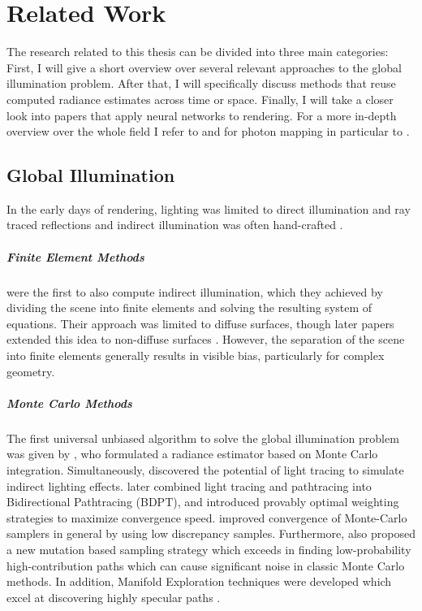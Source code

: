
\chapter{Related Work}
\label{chap:related}
The research related to this thesis can be divided into three main categories:
First, I will give a short overview over several relevant approaches to the global illumination problem.
After that, I will specifically discuss methods that reuse computed radiance estimates across time or space.
Finally, I will take a closer look into papers that apply neural networks to rendering.
For a more in-depth overview over the whole field I refer to \textcite{ritschel2012} and for photon mapping in particular to \textcite{kang2016}.

\section{Global Illumination}
In the early days of rendering, lighting was limited to direct illumination and ray traced reflections  and indirect illumination was often hand-crafted .

\paragraph{Finite Element Methods}
\textcite{goral1984} were the first to also compute indirect illumination, which they achieved by dividing the scene into finite elements and solving the resulting system of equations.
Their approach was limited to diffuse surfaces, though later papers extended this idea to non-diffuse surfaces .
However, the separation of the scene into finite elements generally results in visible bias, particularly for complex geometry.

\paragraph{Monte Carlo Methods}
The first universal unbiased algorithm to solve the global illumination problem was given by \textcite{kajiya1986}, who formulated a radiance estimator based on Monte Carlo integration.
Simultaneously, \textcite{arvo1986} discovered the potential of light tracing to simulate indirect lighting effects.
\textcite{lafortune1993} later combined light tracing and pathtracing into Bidirectional Pathtracing (BDPT), and \textcite{veach1997} introduced provably optimal weighting strategies to maximize convergence speed.
\textcite{keller1995,owen1995} improved convergence of Monte-Carlo samplers in general by using low discrepancy samples.
Furthermore, \textcite{veach1997a} also proposed a new mutation based sampling strategy which exceeds in finding low-probability high-contribution paths which can cause significant noise in classic Monte Carlo methods.
In addition, Manifold Exploration techniques were developed which excel at discovering highly specular paths .

